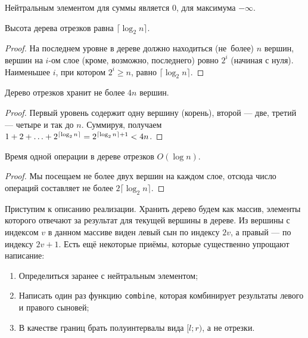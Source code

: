 \begin{example}
    Нейтральным элементом для суммы является $0$, для максимума $-\infty$.
\end{example}

\begin{theorem}
    Высота дерева отрезков равна $\lceil\log_2n\rceil$.
\end{theorem}

\begin{proof}
    На последнем уровне в дереве должно находиться (не~более) $n$ вершин, вершин на $i$-ом слое (кроме, возможно, последнего) ровно $2^i$ (начиная с нуля). Наименьшее $i$, при котором $2^i \geqslant n$, равно $\lceil\log_2n\rceil$.
\end{proof}

\begin{corollary}
    Дерево отрезков хранит не более $4n$ вершин.
\end{corollary}

\begin{proof}
    Первый уровень содержит одну вершину (корень), второй --- две, третий --- четыре и так до $n$. Суммируя, получаем $1 + 2 \hm + \ldots + 2^{\lceil\log_2n\rceil} = 2^{\lceil\log_2n\rceil + 1} < 4n$.
\end{proof}

\begin{corollary}
    Время одной операции в дереве отрезков $O(\log n)$.
\end{corollary}

\begin{proof}
    Мы посещаем не более двух вершин на каждом слое, отсюда число операций составляет не более $2\lceil\log_2n\rceil$.
\end{proof}

Приступим к описанию реализации. Хранить дерево будем как массив, элементы которого отвечают за результат для текущей вершины в дереве. Из вершины с индексом $v$ в данном массиве виден левый сын по индексу $2v$, а правый --- по индексу $2v + 1$. Есть ещё некоторые приёмы, которые существенно упрощают написание:

\begin{enumerate}[nolistsep]
    \item Определиться заранее с нейтральным элементом;
    \item Написать один раз функцию \texttt{combine}, которая комбинирует результаты левого и правого сыновей;
    \item В качестве границ брать полуинтервалы вида $[l; r)$, а не отрезки.
\end{enumerate}

